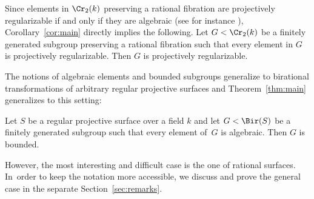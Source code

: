Since elements in $\Cr_2(k)$ preserving a rational fibration are projectively regularizable if and only if they are algebraic {(see for instance \cite[Table\,1]{lonjou2021actions})}, Corollary~\ref{cor:main} directly implies the following.
Let $G<\Cr_2(k)$ be a finitely generated subgroup preserving a rational fibration such that every element in $G$ is projectively regularizable. Then $G$ is projectively regularizable.

The notions of algebraic elements {and bounded subgroups} generalize to birational transformations of arbitrary regular projective surfaces and Theorem~\ref{thm:main} generalizes to this setting:

\begin{theorem}\label{thm:main_general}
Let $S$ be a regular projective surface over a field $k$ and let $G <\Bir(S)$ be a finitely generated subgroup such that every element of~$G$ is algebraic. Then $G$ is {bounded}.
\end{theorem}

However, the most interesting and difficult case is the one of rational surfaces. In~order to keep the notation more accessible, we discuss and prove the general case in the separate Section~\ref{sec:remarks}.

